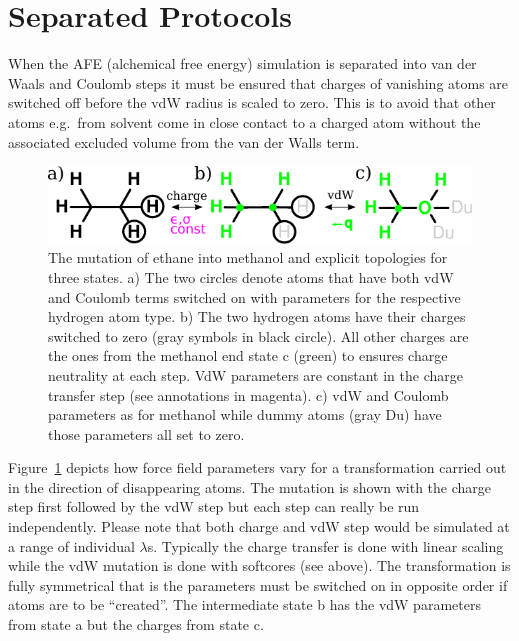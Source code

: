 \documentclass[journal=jctcce,manuscript=suppinfo]{achemso}
\begin{document}
\section{Separated Protocols}
\label{sec:separated}

When the AFE (alchemical free energy) simulation is separated into van
der Waals and Coulomb steps it must be ensured that charges of
vanishing atoms are switched off before the vdW radius is scaled to
zero.  This is to avoid that other atoms e.g.\ from solvent come in
close contact to a charged atom without the associated excluded volume
from the van der Walls term.

\begin{figure}[ht]
\includegraphics[scale=1.0]{figures/dummies.pdf}
\caption{The mutation of ethane into methanol and explicit topologies
  for three states. a) The two circles denote atoms that have both vdW
  and Coulomb terms switched on with parameters for the respective
  hydrogen atom type.  b) The two hydrogen atoms have their charges
  switched to zero (gray symbols in black circle).  All other charges
  are the ones from the methanol end state c (green) to ensures charge
  neutrality at each step.  VdW parameters are constant in the charge
  transfer step (see annotations in magenta).  c) vdW and Coulomb
  parameters as for methanol while dummy atoms (gray Du) have those
  parameters all set to zero.}
\label{fig:dummies}
\end{figure}

Figure~\ref{fig:dummies} depicts how force field parameters vary for a
transformation carried out in the direction of disappearing atoms.
The mutation is shown with the charge step first followed by the vdW
step but each step can really be run independently.  Please note that
both charge and vdW step would be simulated at a range of individual
$\lambda$s.  Typically the charge transfer is done with linear scaling
while the vdW mutation is done with softcores (see above).  The
transformation is fully symmetrical that is the parameters must be
switched on in opposite order if atoms are to be ``created''.  The
intermediate state b has the vdW parameters from state a but the
charges from state c.
\end{document}
